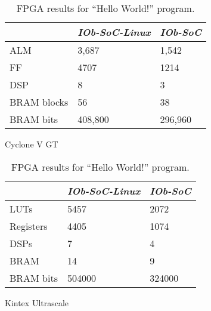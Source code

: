 \begin{table}[!ht]
    \begin{subtable}[h]{0.45\textwidth}
        \centering
        \begin{tabular}{l|l|l|}
            \cline{2-3}
                                              & \textit{IOb-SoC-Linux} & \textit{IOb-SoC} \\ \hline
            \multicolumn{1}{|l|}{ALM}         & 3,687                  & 1,542            \\ \hline
            \multicolumn{1}{|l|}{FF}          & 4707                   & 1214             \\ \hline
            \multicolumn{1}{|l|}{DSP}         & 8                      & 3                \\ \hline
            \multicolumn{1}{|l|}{BRAM blocks} & 56                     & 38               \\ \hline
            \multicolumn{1}{|l|}{BRAM bits}   & 408,800                & 296,960          \\ \hline
        \end{tabular}
       \caption{Cyclone V GT}
       \label{tab:cyclone_hello_int_mem}
    \end{subtable}
    \hfill
    \begin{subtable}[h]{0.45\textwidth}
        \centering
        \begin{tabular}{l|l|l|}
            \cline{2-3}
                                            & \textit{IOb-SoC-Linux} & \textit{IOb-SoC} \\ \hline
            \multicolumn{1}{|l|}{LUTs}      & 5457                   & 2072             \\ \hline
            \multicolumn{1}{|l|}{Registers} & 4405                   & 1074             \\ \hline
            \multicolumn{1}{|l|}{DSPs}      & 7                      & 4                \\ \hline
            \multicolumn{1}{|l|}{BRAM}      & 14                     & 9                \\ \hline
            \multicolumn{1}{|l|}{BRAM bits} & 504000                 & 324000           \\ \hline
        \end{tabular}
        \caption{Kintex Ultrascale}
        \label{tab:kintex_hello_int_mem}
     \end{subtable}
     \caption{FPGA results for \enquote{Hello World!} program.}
     \label{tab:fpga_hello_int_mem}
\end{table}

